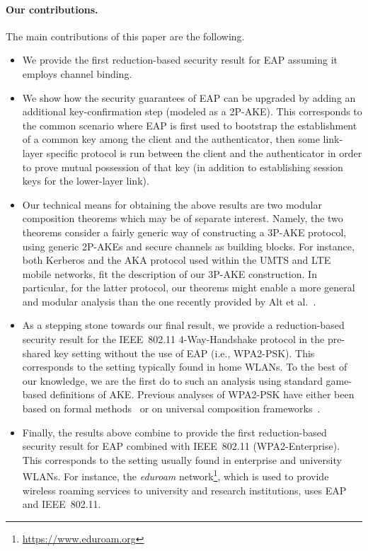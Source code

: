 \paragraph{Our contributions.}
The main contributions of this paper are the following. 
\begin{itemize}
	\item We provide the first reduction-based security result for EAP assuming it employs channel binding. 
	
	\item We show how the security guarantees of EAP can be upgraded by adding an additional key-confirmation step (modeled as a 2P-AKE). 
	This corresponds to the common scenario where EAP is first used to bootstrap the establishment of a common key among the client and the authenticator,
	then some link-layer specific protocol is run between the client and the authenticator in order to prove mutual possession of that key
	(in addition to establishing session keys for the lower-layer link).   
	
	\item Our technical means for obtaining the above results are two modular composition theorems which may be of separate interest.
	Namely,
	the two theorems consider a fairly generic way of constructing a 3P-AKE protocol,
	using generic 2P-AKEs and secure channels as building blocks.
	For instance,
	both Kerberos and the AKA protocol used within the UMTS and LTE mobile networks,
	fit the description of our 3P-AKE construction.
	In particular,
	for the latter protocol,
	our theorems might enable a more general and modular analysis than the one recently provided by Alt et al.~\cite{ACNS:AFMOR16}.
	
		  
	
	\item As a stepping stone towards our final result,
	we provide a reduction-based security result for the IEEE~802.11 4-Way-Handshake protocol in the pre-shared key setting without the use of EAP
	(i.e., WPA2-PSK).
	This corresponds to the  setting typically found in home WLANs.
	To the best of our knowledge,
	we are the first do to such an analysis using standard game-based definitions of AKE. 
	Previous analyses of WPA2-PSK have either been based on formal methods~\cite{CCS:HSDDM05} or on universal composition frameworks~\cite{CCS:KusTue11,RSA:KusTue11}.
	
	\item Finally,
	the results above combine to provide the first reduction-based security result for EAP combined with IEEE~802.11 (WPA2-Enterprise).
	This corresponds to the setting usually found in enterprise and university WLANs.
	For instance,
	the \emph{eduroam} network\footnote{\url{https://www.eduroam.org}},
	which is used to provide wireless roaming services to university and research institutions,
	uses EAP and IEEE~802.11.
	

\end{itemize}

